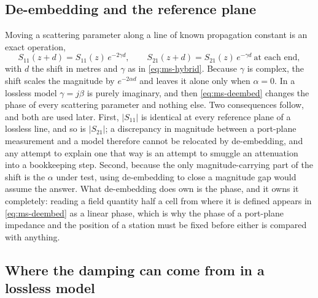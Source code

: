\subsection{De-embedding and the reference plane}
\label{sec:ms-deembed}

Moving a scattering parameter along a line of known propagation constant is an exact operation,
\begin{equation}
  S_{11}(z+d) = S_{11}(z)\,e^{-2\gamma d}, \qquad
  S_{21}(z+d) = S_{21}(z)\,e^{-\gamma d}\ \text{at each end},
  \label{eq:ms-deembed}
\end{equation}
with $d$ the shift in metres and $\gamma$ as in \eqref{eq:ms-hybrid}. Because $\gamma$ is complex, the shift
scales the magnitude by $e^{-2\alpha d}$ and leaves it alone only when $\alpha = 0$. In a lossless model
$\gamma = j\beta$ is purely imaginary, and then \eqref{eq:ms-deembed} changes the phase of every scattering
parameter and nothing else. Two consequences follow, and both are used later. First, $|S_{11}|$ is identical at
every reference plane of a lossless line, and so is $|S_{21}|$; a discrepancy in magnitude between a
port-plane measurement and a model therefore cannot be relocated by de-embedding, and any attempt to explain
one that way is an attempt to smuggle an attenuation into a bookkeeping step. Second, because the only
magnitude-carrying part of the shift is the $\alpha$ under test, using de-embedding to close a magnitude gap
would assume the answer. What de-embedding does own is the phase, and it owns it completely: reading a field
quantity half a cell from where it is defined appears in \eqref{eq:ms-deembed} as a linear phase, which is why
the phase of a port-plane impedance and the position of a station must be fixed before either is compared
with anything.

\subsection{Where the damping can come from in a lossless model}
\label{sec:ms-lossless}

